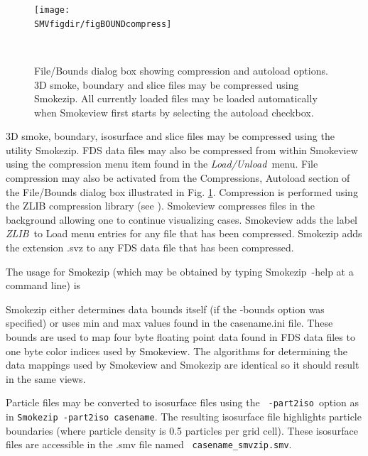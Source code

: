 \label{ch:smokezip}

\begin{figure}[bph]
\centerline{\texttt{[image: \\SMVfigdir/figBOUNDcompress]}\ }
\caption[Compress Files and Autoload dialog box.] {File/Bounds dialog
box showing compression and autoload options.  3D smoke,  boundary and slice
files may be compressed using Smokezip.  All currently loaded
files may be loaded automatically when Smokeview first starts by
selecting the autoload checkbox.}\ \label{figBOUNDScompress}
\end{figure}

3D smoke, boundary, isosurface and slice files may be compressed
using the utility Smokezip.  FDS data files may also be compressed
from within Smokeview using the compression menu item found in the
{\em Load/Unload}\ menu.  File compression may also be activated
from the Compressions, Autoload section of the File/Bounds
dialog box illustrated in Fig. \ref{figBOUNDScompress}.
Compression is performed using the ZLIB compression library (see
). Smokeview compresses files in the
background allowing one to continue visualizing cases.  Smokeview
adds the label {\em ZLIB}\ to Load menu entries for any file that
has been compressed. Smokezip adds the extension .svz to any FDS
data file that has been compressed.

The usage for Smokezip (which may be obtained by typing Smokezip~-help at a command line) is



Smokezip either determines data bounds itself (if the -bounds option was specified)
or uses min and max values found in the casename.ini
file.  These bounds are used to map four byte floating point data
found in FDS data files to one byte color indices used by
Smokeview.  The algorithms for determining
the data mappings used by Smokeview and Smokezip are identical so it
should result in the same views.

Particle files may be converted to isosurface files using the {\tt
-part2iso}\ option as in {\tt Smokezip -part2iso casename}.  The
resulting isosurface file highlights particle boundaries (where
particle density is 0.5 particles per grid cell). These isosurface
files are accessible in the .smv file named {\tt
casename\_smvzip.smv}.
